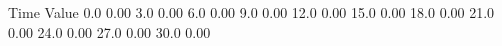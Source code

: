 \documentclass[preview]{standalone}
\begin{document}
\centering Time Value 0.0 0.00 3.0 0.00 6.0 0.00 9.0 0.00 12.0 0.00 15.0 0.00 18.0 0.00 21.0 0.00 24.0 0.00 27.0 0.00 30.0 0.00
\end{document}
